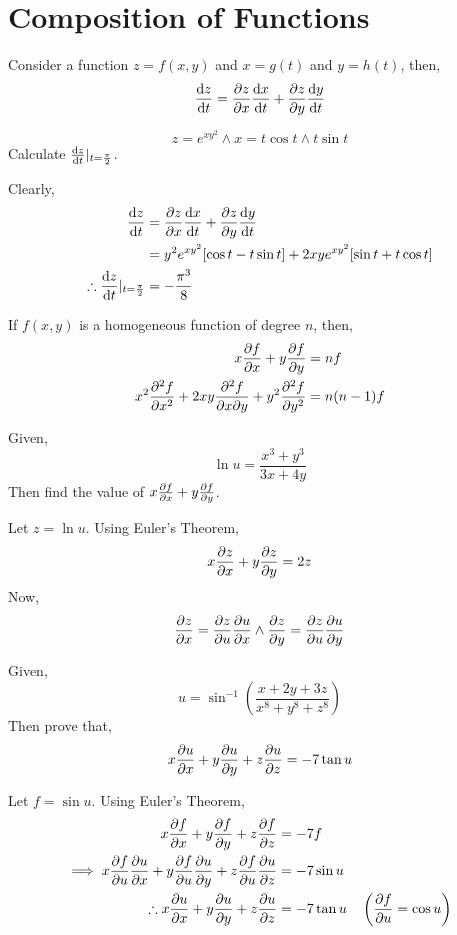 \section{Composition of Functions}
Consider a function $z=f(x,y)$ and $x=g(t)$ and $y=h(t)$, then,
\[\dv{z}{t}=\pdv{z}{x}\dv{x}{t}+\pdv{z}{y}\dv{y}{t}\]
\begin{eg}
	\[z=e^{xy^2}\land x=t\cos t\land t\sin t\]
	Calculate $\dv{z}{t}\vert_{t=\frac{\pi}{2}}$.
\end{eg}
\begin{explanation}
	Clearly,
	\[\begin{split}
		\dv{z}{t}&=\pdv{z}{x}\dv{x}{t}+\pdv{z}{y}\dv{y}{t}\\
		&=y^2e^{xy^2}[\cos t-t\sin t]+2xye^{xy^2}[\sin t+t\cos t]\\
		\therefore \dv{z}{t}\vert_{t=\frac{\pi}{2}}&=-\frac{\pi^3}{8}
	\end{split}\]
\end{explanation}
\begin{theorem}
	If $f(x,y)$ is a homogeneous function of degree $n$, then,
	\[\begin{split}
		x\pdv{f}{x}+y\pdv{f}{y}&=nf\\
		x^2\pdv[2]{f}{x}+2xy\pdv{f}{x}{y}+y^2\pdv[2]{f}{y}&=n(n-1)f
	\end{split}\]
\end{theorem}
\begin{eg}
	Given,
	\[\ln u=\frac{x^3+y^3}{3x+4y}\]
	Then find the value of $x\pdv{f}{x}+y\pdv{f}{y}$.
\end{eg}
\begin{explanation}
	Let $z=\ln u$. Using Euler's Theorem,
	\[x\pdv{z}{x}+y\pdv{z}{y}=2z\]
	Now,
	\[\pdv{z}{x}=\pdv{z}{u}\pdv{u}{x} \land \pdv{z}{y}=\pdv{z}{u}\pdv{u}{y}\]
\end{explanation}
\begin{eg}
	Given,
	\[u=\sin^{-1}\left(\frac{x+2y+3z}{x^8+y^8+z^8}\right)\]
	Then prove that,
	\[x\pdv{u}{x}+y\pdv{u}{y}+z\pdv{u}{z}=-7\tan u\]
\end{eg}
\begin{explanation}
	Let $f=\sin u$. Using Euler's Theorem,
	\[\begin{split}
		x\pdv{f}{x}+y\pdv{f}{y}+z\pdv{f}{z}&=-7f\\
		\implies x\pdv{f}{u}\pdv{u}{x}+y\pdv{f}{u}\pdv{u}{y}+z\pdv{f}{u}\pdv{u}{z}&=-7\sin u\\
		\therefore x\pdv{u}{x}+y\pdv{u}{y}+z\pdv{u}{z}&=-7\tan u \quad \left(\pdv{f}{u}=\cos u\right)
	\end{split}\]
\end{explanation}
